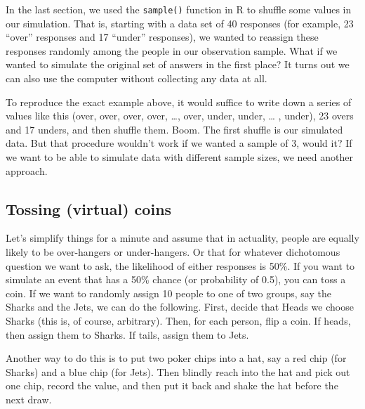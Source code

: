 \documentclass[openany]{book}
\begin{document}
In the last section, we used the \texttt{sample()} function in R to shuffle some values in our simulation. That is, starting with a data set of 40 responses (for example, 23 ``over'' responses and 17 ``under'' responses), we wanted to reassign these responses randomly among the people in our observation sample. What if we wanted to simulate the original set of answers in the first place? It turns out we can also use the computer without collecting any data at all.

To reproduce the exact example above, it would suffice to write down a series of values like this (over, over, over, over, \ldots{}, over, under, under, \ldots{} , under), 23 overs and 17 unders, and then shuffle them. Boom. The first shuffle is our simulated data. But that procedure wouldn't work if we wanted a sample of 3, would it? If we want to be able to simulate data with different sample sizes, we need another approach.

\hypertarget{tossing-virtual-coins}{%
\subsection*{Tossing (virtual) coins}\label{tossing-virtual-coins}}

Let's simplify things for a minute and assume that in actuality, people are equally likely to be over-hangers or under-hangers. Or that for whatever dichotomous question we want to ask, the likelihood of either responses is 50\%.
If you want to simulate an event that has a 50\% chance (or probability of 0.5), you can toss a coin. If we want to randomly assign 10 people to one of two groups, say the Sharks and the Jets, we can do the following. First, decide that Heads we choose Sharks (this is, of course, arbitrary). Then, for each person, flip a coin. If heads, then assign them to Sharks. If tails, assign them to Jets.

Another way to do this is to put two poker chips into a hat, say a red chip (for Sharks) and a blue chip (for Jets). Then blindly reach into the hat and pick out one chip, record the value, and then put it back and shake the hat before the next draw.
\end{document}
